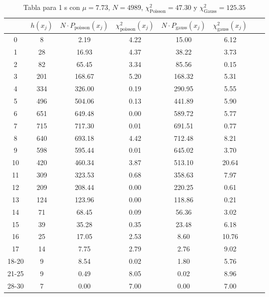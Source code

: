 \begin{center}
\begin{table}[H]
\caption{Tabla para 1 s con $\mu=7.73$, $N=4989$, $\chi^2_{\text{Poisson}}=47.30$  y $\chi^2_{\text{Gauss}}=125.35$}
\label{Tab:histo__1s}
\begin{tabular}{cccccccc}
\toprule
 & $h(x_j)$ & $N \cdot P_{\text{poisson}} (x_j)$ & $\chi^2_{\text{poisson}}(x_j)$ & $N \cdot P_{\text{gauss}} (x_j)$ & $\chi^2_{\text{gauss}}(x_j)$ \\
\midrule
0 & \num{    8} & \num{2.19} & \num{4.22} & \num{15.00} & \num{6.12} \\
1 & \num{   28} & \num{16.93} & \num{4.37} & \num{38.22} & \num{3.73} \\
2 & \num{   82} & \num{65.45} & \num{3.34} & \num{85.56} & \num{0.15} \\
3 & \num{  201} & \num{168.67} & \num{5.20} & \num{168.32} & \num{5.31} \\
4 & \num{  334} & \num{326.00} & \num{0.19} & \num{290.95} & \num{5.55} \\
5 & \num{  496} & \num{504.06} & \num{0.13} & \num{441.89} & \num{5.90} \\
6 & \num{  651} & \num{649.48} & \num{0.00} & \num{589.72} & \num{5.77} \\
7 & \num{  715} & \num{717.30} & \num{0.01} & \num{691.51} & \num{0.77} \\
8 & \num{  640} & \num{693.18} & \num{4.42} & \num{712.48} & \num{8.21} \\
9 & \num{  598} & \num{595.44} & \num{0.01} & \num{645.02} & \num{3.70} \\
10 & \num{  420} & \num{460.34} & \num{3.87} & \num{513.10} & \num{20.64} \\
11 & \num{  309} & \num{323.53} & \num{0.68} & \num{358.63} & \num{7.97} \\
12 & \num{  209} & \num{208.44} & \num{0.00} & \num{220.25} & \num{0.61} \\
13 & \num{  124} & \num{123.96} & \num{0.00} & \num{118.86} & \num{0.21} \\
14 & \num{   71} & \num{68.45} & \num{0.09} & \num{56.36} & \num{3.02} \\
15 & \num{   39} & \num{35.28} & \num{0.35} & \num{23.48} & \num{6.18} \\
16 & \num{   25} & \num{17.05} & \num{2.53} & \num{8.60} & \num{10.76} \\
17 & \num{   14} & \num{7.75} & \num{2.79} & \num{2.76} & \num{9.02} \\
18-20 & \num{    9} & \num{8.54} & \num{0.02} & \num{1.80} & \num{5.76} \\
21-25 & \num{    9} & \num{0.49} & \num{8.05} & \num{0.02} & \num{8.96} \\
28-30 & \num{    7} & \num{0.00} & \num{7.00} & \num{0.00} & \num{7.00} \\
\bottomrule
\end{tabular}
\end{table}
\end{center}
